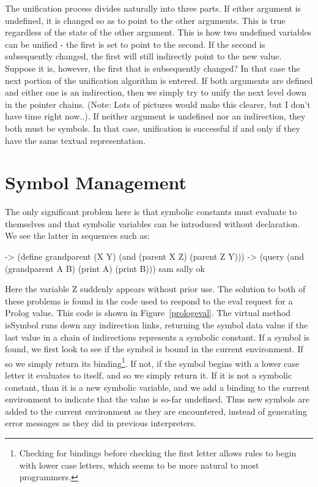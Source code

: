 The unification process divides naturally into three parts.  If either
argument is undefined, it is changed so as to point to the other arguments.
This is true regardless of the state of the other argument.  This is how
two undefined variables can be unified - the first is set to point to the
second.   If the second is subsequently changed, the first will still
indirectly point to the new value.  Suppose it is, however, the first that
is subsequently changed?  In that case the next portion of the unification
algorithm is entered.  If both arguments are defined and either one is an
indirection, then we simply try to unify the next level down in the pointer
chains.  (Note: Lots of pictures would make this clearer, but I don't have
time right now..).  If neither argument is undefined nor an indirection,
they both must be symbols.  In that case, unification is successful if and
only if they have the same textual representation.

\section{Symbol Management}

The only significant problem here is that symbolic constants must evaluate to 
themselves and that symbolic variables can be introduced without
declaration.  We see the latter in sequences such as:

\begin{cprog}
-> (define grandparent (X Y)
	(and (parent X Z) (parent Z Y)))
-> (query (and (grandparent A B) (print A) (print B)))
sam
sally
ok
\end{cprog}

Here the variable Z suddenly appears without prior use.  The solution to
both of these problems is found in the code used to respond to the {\sf
eval} request for a Prolog value.  This code is shown in
Figure~\ref{prologeval}.  The virtual method {\sf isSymbol} runs down any
indirection links, returning the symbol data value if the last value in a
chain of indirections represents a symbolic constant.
If a symbol is found, we first look to see if the symbol is bound in the
current environment.  If so we simply return its binding\footnote{Checking
for bindings before checking the first letter allows rules to begin with
lower case letters, which seems to be more natural to most programmers.}.  
If not, if the
symbol begins with a lower case letter it evaluates to itself, and so we
simply return it.  If it is not a symbolic constant, than it is a new
symbolic variable, and we add a binding to the current environment to
indicate that the value is so-far undefined.  Thus new symbols are added to
the current environment as they are encountered, instead of generating
error messages as they did in previous interpreters.

